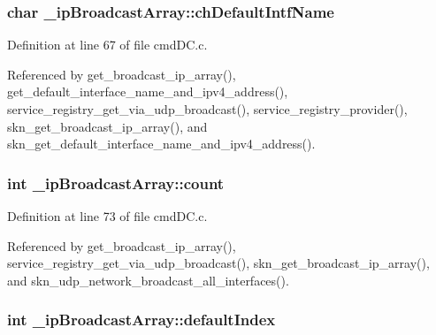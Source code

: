 \subsubsection[{\texorpdfstring{ch\+Default\+Intf\+Name}{chDefaultIntfName}}]{\setlength{\rightskip}{0pt plus 5cm}char \+\_\+ip\+Broadcast\+Array\+::ch\+Default\+Intf\+Name}\hypertarget{struct__ip_broadcast_array_a06dab8742df19b5aec8538842617778d}{}\label{struct__ip_broadcast_array_a06dab8742df19b5aec8538842617778d}


Definition at line 67 of file cmd\+D\+C.\+c.



Referenced by get\+\_\+broadcast\+\_\+ip\+\_\+array(), get\+\_\+default\+\_\+interface\+\_\+name\+\_\+and\+\_\+ipv4\+\_\+address(), service\+\_\+registry\+\_\+get\+\_\+via\+\_\+udp\+\_\+broadcast(), service\+\_\+registry\+\_\+provider(), skn\+\_\+get\+\_\+broadcast\+\_\+ip\+\_\+array(), and skn\+\_\+get\+\_\+default\+\_\+interface\+\_\+name\+\_\+and\+\_\+ipv4\+\_\+address().

\subsubsection[{\texorpdfstring{count}{count}}]{\setlength{\rightskip}{0pt plus 5cm}int \+\_\+ip\+Broadcast\+Array\+::count}\hypertarget{struct__ip_broadcast_array_a971377a4c995292b8bd908f185cfc844}{}\label{struct__ip_broadcast_array_a971377a4c995292b8bd908f185cfc844}


Definition at line 73 of file cmd\+D\+C.\+c.



Referenced by get\+\_\+broadcast\+\_\+ip\+\_\+array(), service\+\_\+registry\+\_\+get\+\_\+via\+\_\+udp\+\_\+broadcast(), skn\+\_\+get\+\_\+broadcast\+\_\+ip\+\_\+array(), and skn\+\_\+udp\+\_\+network\+\_\+broadcast\+\_\+all\+\_\+interfaces().

\subsubsection[{\texorpdfstring{default\+Index}{defaultIndex}}]{\setlength{\rightskip}{0pt plus 5cm}int \+\_\+ip\+Broadcast\+Array\+::default\+Index}\hypertarget{struct__ip_broadcast_array_a5822ff77ae9f31bd3b4298d463c02f1f}{}\label{struct__ip_broadcast_array_a5822ff77ae9f31bd3b4298d463c02f1f}


